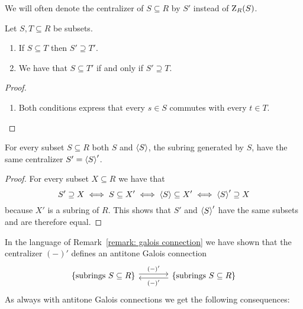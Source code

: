 \begin{notation}
  We will often denote the centralizer of $S \subseteq R$ by $S'$ instead of $\operatorname{Z}_R(S)$.
\end{notation}


\begin{lemma}
  \label{lemma: centralizes is Galois connection}
  Let $S, T \subseteq R$ be subsets.
  \begin{enumerate}
    \item
      If $S \subseteq T$ then $S' \supseteq T'$.
    \item
      We have that $S \subseteq T'$ if and only if $S' \supseteq T$.
  \end{enumerate}
\end{lemma}


\begin{proof}
  \begin{enumerate}[start = 2]
    \item
      Both conditions express that every $s \in S$ commutes with every $t \in T$.
    \qedhere
  \end{enumerate}
\end{proof}


\begin{corollary}
  For every subset $S \subseteq R$ both $S$ and $\left\langle S \right\rangle$, the subring generated by $S$, have the same centralizer $S' = \left\langle S \right\rangle'$.
\end{corollary}


\begin{proof}
  For every subset $X \subseteq R$ we have that
  \[
          S' \supseteq X
    \iff  S \subseteq X'
    \iff  \left\langle S \right\rangle \subseteq X'
    \iff  \left\langle S \right\rangle' \supseteq X
  \]
  because $X'$ is a subring of $R$.
  This shows that $S'$ and $\left\langle S \right\rangle'$ have the same subsets and are therefore equal.
\end{proof}


\begin{fluff}
  In the language of Remark~\ref{remark: galois connection} we have shown that the centralizer $(-)'$ defines an antitone Galois connection
  \[
  \begin{tikzcd}[column sep = large]
      \{ \text{subrings $S \subseteq R$} \}
      \arrow[shift left]{r}[above]{(-)'}
    & \{ \text{subrings $S \subseteq R$} \}
      \arrow[shift left]{l}[below]{(-)'}
  \end{tikzcd}
  \]
  As always with antitone Galois connections we get the following consequences:
\end{fluff}


